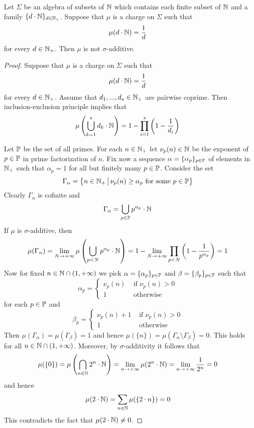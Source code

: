 \begin{proposition}\label{proposition:natural_density_charges_are_not_sigma_additive}
    Let $\Sigma$ be an algebra of subsets of ${\mathbb N}$ which contains each finite subset of ${\mathbb N}$ and a family $\{d\cdot {\mathbb N}\}_{d \in {\mathbb N}_+}$. Suppose that $\mu$ is a charge on $\Sigma$ such that
    $$\mu(d\cdot {\mathbb N}) = \frac{1}{d}$$
    for every $d \in {\mathbb N}_+$. Then $\mu$ is not $\sigma$-additive.
\end{proposition}
\begin{proof}
    Suppose that $\mu$ is a charge on $\Sigma$ such that
    $$\mu(d\cdot {\mathbb N}) = \frac{1}{d}$$
    for every $d \in {\mathbb N}_+$. Assume that $d_1,...,d_s \in {\mathbb N}_+$ are pairwise coprime. Then inclusion-exclusion principle implies that
    $$\mu\left(\bigcup_{k=1}^sd_k\cdot {\mathbb N}\right) = 1 - \prod_{i=1}^s\left(1 - \frac{1}{d_i}\right)$$

    Let ${\mathbb P}$ be the set of all primes. For each $n \in {\mathbb N}_+$ let $\nu_p(n) \in {\mathbb N}$ be the exponent of $p \in {\mathbb P}$ in prime factorization of $n$. Fix now a sequence $\alpha = \{\alpha_p\}_{p\in {\mathbb P}}$ of elements in ${\mathbb N}_+$ such that $\alpha_p = 1$ for all but finitely many $p \in {\mathbb P}$. Consider the set
    $$\Gamma_{\alpha} = \big\{n\in {\mathbb N}_+\,\big|\,\nu_p(n) \geq \alpha_p\mbox{ for some }p\in {\mathbb P}\big\}$$
    Clearly $\Gamma_{\alpha}$ is cofinite and
    $$\Gamma_{\alpha} = \bigcup_{p\in {\mathbb P}}p^{\alpha_p}\cdot {\mathbb N}$$
    If $\mu$ is $\sigma$-additive, then
    $$\mu(\Gamma_{\alpha}) = \lim_{N \rightarrow +\infty}\mu\left(\bigcup_{p < N}p^{\alpha_p}\cdot {\mathbb N}\right) = 1 - \lim_{N\rightarrow +\infty}\prod_{p < N}\left(1 - \frac{1}{p^{\alpha_p}}\right) = 1$$
    Now for fixed $n \in {\mathbb N} \cap (1,+\infty)$ we pick $\alpha = \{\alpha_p\}_{p\in {\mathbb P}}$ and $\beta = \{\beta_p\}_{p\in {\mathbb P}}$ such that
    $$\alpha_p = \begin{cases}
            \nu_p(n) & \mbox{ if }\nu_p(n) > 0 \\
            1        & \mbox{ otherwise }
        \end{cases}$$
    for each $p \in {\mathbb P}$ and
    $$\beta_p = \begin{cases}
            \nu_p(n) + 1 & \mbox{ if }\nu_p(n) > 0 \\
            1            & \mbox{ otherwise }
        \end{cases}$$
    Then $\mu(\Gamma_{\alpha}) = \mu(\Gamma_{\beta}) = 1$ and hence $\mu(\{n\}) = \mu\left(\Gamma_{\alpha} \setminus \Gamma_{\beta}\right) = 0$. This holds for all $n \in {\mathbb N} \cap (1,+\infty)$. Moreover, by $\sigma$-additivity it follows that
    $$\mu(\{0\}) = \mu\left(\bigcap_{n \in {\mathbb N}}2^n \cdot {\mathbb N}\right) = \lim_{n\rightarrow +\infty}\mu(2^n\cdot {\mathbb N}) = \lim_{n\rightarrow +\infty}\frac{1}{2^n} = 0$$
    and hence
    $$\mu(2\cdot {\mathbb N}) = \sum_{n\in {\mathbb N}}\mu(\{2\cdot n\}) = 0$$
    This contradicts the fact that $\mu(2\cdot {\mathbb N}) \neq 0$.
\end{proof}

